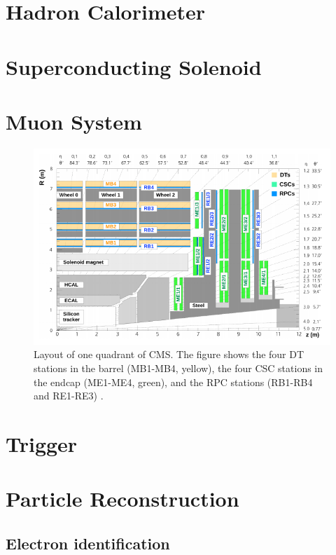 \section{Hadron Calorimeter} \label{sec-HadronCalorimeter}

\section{Superconducting Solenoid} \label{sec-SuperconductingSolenoid}

\section{Muon System} \label{sec-MuonSystem}

\begin{figure}\label{fig-CMSLongitudinalView}
\includegraphics[width=\textwidth]{Figures/CMSLongitudinalView.png}
\caption{Layout of one quadrant of CMS. The figure shows the four DT stations in the barrel (MB1-MB4, yellow), the four CSC stations in the endcap (ME1-ME4, green), and the RPC stations (RB1-RB4 and RE1-RE3) \cite{CMSexperiment}.}
\end{figure}

\section{Trigger} \label{sec-Trigger}

\section{Particle Reconstruction} \label{sec-ParticleReconstruction}

\subsection{Electron identification}


